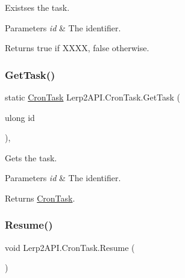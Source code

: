 Existses the task. 


\begin{DoxyParams}{Parameters}
{\em id} & The identifier.\\
\hline
\end{DoxyParams}
\begin{DoxyReturn}{Returns}
{\ttfamily true} if X\+X\+XX, {\ttfamily false} otherwise.
\end{DoxyReturn}
\mbox{\label{class_lerp2_a_p_i_1_1_cron_task_ab9498ba4ec1aed3465f2b67a53ca5d58}} 
\subsubsection{\texorpdfstring{Get\+Task()}{GetTask()}}
{\footnotesize\ttfamily static \hyperlink{class_lerp2_a_p_i_1_1_cron_task}{Cron\+Task} Lerp2\+A\+P\+I.\+Cron\+Task.\+Get\+Task (\begin{DoxyParamCaption}\item[{ulong}]{id }\end{DoxyParamCaption})\hspace{0.3cm}{\ttfamily [inline]}, {\ttfamily [static]}}



Gets the task. 


\begin{DoxyParams}{Parameters}
{\em id} & The identifier.\\
\hline
\end{DoxyParams}
\begin{DoxyReturn}{Returns}
\hyperlink{class_lerp2_a_p_i_1_1_cron_task}{Cron\+Task}.
\end{DoxyReturn}
\mbox{\label{class_lerp2_a_p_i_1_1_cron_task_a48458e0d47de3ae5e503ea0942adb076}} 
\subsubsection{\texorpdfstring{Resume()}{Resume()}}
{\footnotesize\ttfamily void Lerp2\+A\+P\+I.\+Cron\+Task.\+Resume (\begin{DoxyParamCaption}{ }\end{DoxyParamCaption})\hspace{0.3cm}{\ttfamily [inline]}}



